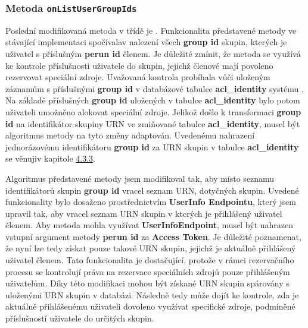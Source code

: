 \documentclass[
  printed, %
  twoside, %
  table,   %
  nolof,     %
  nolot,     %
]{fithesis3}
\begin{document}
\subsubsection{Metoda \texttt{onListUserGroupIds}}
Poslední modifikovaná metoda v třídě  je . Funkcionalita představené metody ve stávající implementaci spočívala\break v nalezení všech \textbf{group id} skupin, kterých je uživatel s příslušným \textbf{perun id} členem. Je důležité zmínit, že metoda  se využívá ke kontrole příslušnosti uživatele do skupin, jejichž členové mají povoleno rezervovat speciální zdroje. Uvažovaná kontrola probíhala vůči uloženým záznamům s příslušnými \textbf{group id} v databázové tabulce \textbf{acl\_identity} systému . Na základě příslušných \textbf{group id} uložených v tabulce \textbf{acl\_identity} bylo potom uživateli umožněno alokovat speciální zdroje. Jelikož došlo k transformaci \textbf{group id} na identifikátor skupiny URN ve zmiňované tabulce \textbf{acl\_identity}, musel být algoritmus metody  na tyto změny adaptován. Uvedenému nahrazení jednorázovému identifikátoru \textbf{group id} za URN skupin v tabulce \textbf{acl\_identity} se věnuji\break v kapitole \hyperref[zpracovaniAUlozeniPerun]{4.3.3}. 

\par

Algoritmus představené metody  jsem modifikoval tak, aby místo seznamu identifikátorů skupin \textbf{group id} vracel seznam URN, dotyčných skupin. Uvedené funkcionality bylo dosaženo prostřednictvím \textbf{UserInfo Endpointu}, který jsem upravil tak, aby vracel seznam URN skupin v kterých je přihlášený uživatel členem. Aby metoda  mohla využívat \textbf{UserInfo\break Endpoint}, musel být nahrazen vstupní argument metody \textbf{perun id} za \textbf{Access Token}. Je důležité poznamenat, že nyní lze tedy získat pouze takové URN skupin, jejichž je aktuálně přihlášený uživatel členem. Tato funkcionalita je dostačující, protože v rámci rezervačního procesu se kontrolují práva na rezervace speciálních zdrojů pouze přihlášeným uživatelům. Díky této modifikaci mohou být získané URN skupin spárovány s uloženými URN skupin v databázi. Následně tedy může dojít ke kontrole, zda je aktuálně přihlášenému uživateli dovoleno využívat specifické zdroje, podmíněné příslušností uživatele do určitých skupin.
\end{document}
